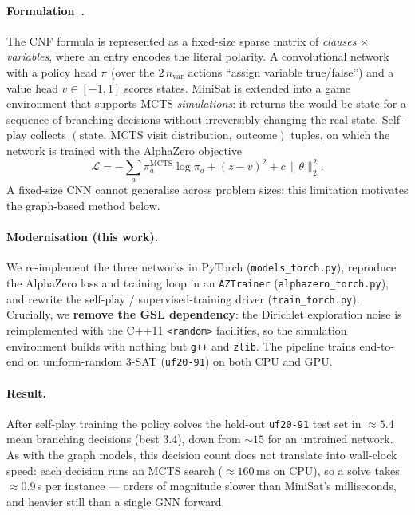 \documentclass[11pt]{article}
\begin{document}
\paragraph{Formulation~\cite{wang2018}.} The CNF formula is represented as a
fixed-size sparse matrix of \emph{clauses} $\times$ \emph{variables}, where an entry
encodes the literal polarity. A convolutional network with a policy head $\pi$
(over the $2\,n_{\text{var}}$ actions ``assign variable true/false'') and a value
head $v\in[-1,1]$ scores states. MiniSat is extended into a game environment that
supports MCTS \emph{simulations}: it returns the would-be state for a sequence of
branching decisions without irreversibly changing the real state. Self-play
collects $(\text{state},\ \text{MCTS visit distribution},\ \text{outcome})$ tuples,
on which the network is trained with the AlphaZero objective
\begin{equation}
  \mathcal{L} = -\textstyle\sum_a \pi^{\text{MCTS}}_a \log \pi_a
              + (z - v)^2 + c\,\lVert\theta\rVert_2^2 .
\end{equation}
A fixed-size CNN cannot generalise across problem sizes; this limitation motivates
the graph-based method below.

\paragraph{Modernisation (this work).} We re-implement the three networks in PyTorch
(\texttt{models\_torch.py}), reproduce the AlphaZero loss and training loop in an
\texttt{AZTrainer} (\texttt{alphazero\_torch.py}), and rewrite the self-play /
supervised-training driver (\texttt{train\_torch.py}). Crucially, we \textbf{remove
the GSL dependency}: the Dirichlet exploration noise is reimplemented with the
C++11 \texttt{<random>} facilities, so the simulation environment builds with
nothing but \texttt{g++} and \texttt{zlib}. The pipeline trains end-to-end on
uniform-random 3-SAT (\texttt{uf20-91}) on both CPU and GPU.

\paragraph{Result.} After self-play training the policy solves the held-out
\texttt{uf20-91} test set in $\approx\!5.4$ mean branching decisions (best $3.4$),
down from $\sim\!15$ for an untrained network. As with the graph models, this
decision count does not translate into wall-clock speed: each decision runs an MCTS
search ($\approx\!160$\,ms on CPU), so a solve takes $\approx\!0.9$\,s per instance
--- orders of magnitude slower than MiniSat's milliseconds, and heavier still than a
single GNN forward.
\end{document}
